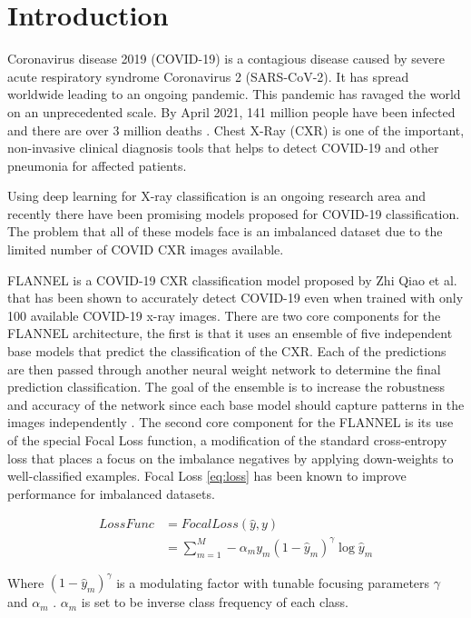 \documentclass{sigkddExp}
\begin{document}
\section{Introduction}
Coronavirus disease 2019 (COVID-19) is a contagious disease caused by severe
acute respiratory syndrome Coronavirus 2 (SARS-CoV-2). It has spread worldwide
leading to an ongoing pandemic. This pandemic has ravaged the world on an
unprecedented scale. By April 2021, 141 million people have been infected and
there are over 3 million deaths \cite{whocovid1920-apr-21}. Chest X-Ray (CXR) is
one of the important, non-invasive clinical diagnosis tools that helps to detect
COVID-19 and other pneumonia for affected patients.

Using deep learning for X-ray classification is an ongoing research area and
recently there have been promising models proposed for COVID-19 classification.
The problem that all of these models face is an imbalanced dataset due to the
limited number of COVID CXR images available.

FLANNEL is a COVID-19 CXR classification model proposed by Zhi Qiao et al.
\cite{10.1093/jamia/ocaa280} that has been shown to accurately detect COVID-19
even when trained with only 100 available COVID-19 x-ray images. There are two
core components for the FLANNEL architecture, the first is that it uses an
ensemble \cite{58871} of five independent base models that predict the
classification of the CXR. Each of the predictions are then passed through
another neural weight network to determine the final prediction classification.
The goal of the ensemble is to increase the robustness and accuracy of the
network since each base model should capture patterns in the images
independently \cite{combine}. The second core component for the FLANNEL is its
use of the special Focal Loss \cite{lin2018focal} function, a modification of
the standard cross-entropy loss that places a focus on the imbalance negatives
by applying down-weights to well-classified examples. Focal Loss \ref{eq:loss}
has been known to improve performance for imbalanced datasets.

\begin{align}
    LossFunc &=FocalLoss(\hat{y},y) \\
    &=\sum_{m=1}^{M} - \alpha_m y_m (1-\hat{y}_m)^\gamma \log{\hat{y}_m}
    \label{eq:loss}
\end{align}

Where $(1-\hat{y}_m)^\gamma$ is a modulating factor with tunable focusing
parameters $\gamma$ and $\alpha_m$ \cite{10.1093/jamia/ocaa280}. $\alpha_m$
is set to be inverse class frequency of each class.
\end{document}
